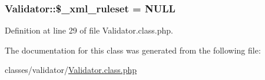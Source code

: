 \subsubsection[{\$\+\_\+xml\+\_\+ruleset}]{\setlength{\rightskip}{0pt plus 5cm}Validator\+::\$\+\_\+xml\+\_\+ruleset = N\+U\+L\+L}\label{classValidator_a45a0aaa905493683be7fc01a80837a26}


Definition at line 29 of file Validator.\+class.\+php.



The documentation for this class was generated from the following file\+:\begin{DoxyCompactItemize}
\item 
classes/validator/\hyperlink{Validator_8class_8php}{Validator.\+class.\+php}\end{DoxyCompactItemize}
